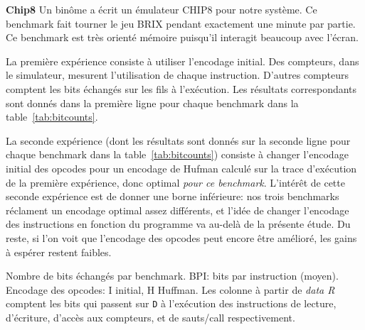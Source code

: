 \documentclass[architecture]{compas2018}
\newcommand{\todo}[1]{\textcolor{red}{TODO: #1}}
\begin{document}
\textbf{Chip8}
Un binôme a écrit un émulateur CHIP8 \cite{Chip8:1978} pour notre système.
Ce benchmark fait tourner le jeu BRIX pendant exactement une minute par partie.
Ce benchmark est très orienté mémoire puisqu'il interagit beaucoup avec l'écran.
\medskip

La première expérience consiste à utiliser l'encodage initial.
Des compteurs, dans le simulateur, mesurent l'utilisation de chaque instruction.%
D'autres compteurs comptent les bits échangés sur les fils à l'exécution.
Les résultats correspondants sont donnés dans la première  ligne pour chaque benchmark dans la table~\ref{tab:bitcounts}.

La seconde expérience (dont les résultats sont donnés sur la seconde ligne pour chaque benchmark dans la table~\ref{tab:bitcounts}) consiste à changer l'encodage initial des opcodes pour un encodage de Hufman calculé sur la trace d'exécution de la première expérience, donc  optimal \emph{pour ce benchmark}.
L'intérêt de cette seconde expérience est de donner une borne inférieure: nos trois benchmarks réclament un encodage optimal assez différents, et l'idée de changer l'encodage des instructions en fonction du programme va au-delà de la présente étude.
Du reste, si l'on voit que l'encodage des opcodes peut encore être amélioré,  les gains à espérer restent faibles.


\iffalse
./asm.py -v -b prog/mult.s
./emu/emu -s -t prog/mult.bin
./emu/emu -i prog/mult.bin | ./huffmann.py > mult.huff
./asm.py --loadhuffman mult.huff -v -b prog/mult.s -o  prog/mult.huff.bin
./emu/emu -s -t -lh mult.huff -i prog/mult.huff.bin

python3 ./matmulstat/makematrix.py
./asm.py -v -b prog/matmul.s
./emu/emu -s -t prog/matmul.bin --load 65536:mat32x32.bytes
./emu/emu -i prog/matmul.bin --load 65536:mat32x32.bytes | ./huffmann.py > matmul.huff
./asm.py --loadhuffman matmul.huff -v -b prog/matmul.s -o prog/matmul.huff.bin
./emu/emu -s -t -lh matmul.huff prog/matmul.huff.bin --load 65536:mat32x32.bytes

idem mais avec python3 ./matmulstat/makematrix.py 0.1 pour une matrice creuse

\fi


\begin{table}
  \centering
  \benchmark
  \caption{Nombre de bits échangés par benchmark. BPI: bits par instruction (moyen). Encodage des opcodes: I initial, H Huffman. Les colonne à partir de \emph{data R} comptent  les bits qui passent sur \texttt{D} à l'exécution des instructions de lecture, d'écriture, d'accès aux compteurs, et de sauts/call  respectivement. }
  \label{tab:bitcounts}
\end{table}
\end{document}
